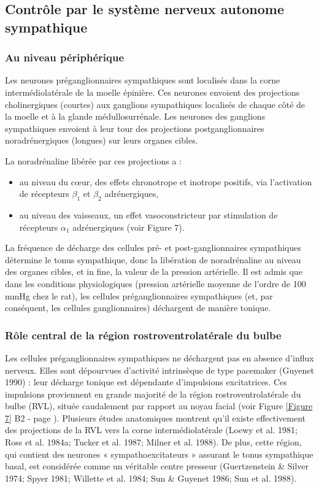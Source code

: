 \documentclass[a4paper,12pt,twoside]{report}
\begin{document}
\subsection{Contrôle par le système nerveux autonome sympathique}

\subsubsection{Au niveau périphérique}

Les neurones préganglionnaires sympathiques sont localisés dans la corne intermédiolatérale de la moelle épinière. Ces neurones envoient des projections cholinergiques (courtes) aux ganglions sympathiques localisés de chaque côté de la moelle et à la glande médullosurrénale. Les neurones des ganglions sympathiques envoient à leur tour des projections postganglionnaires noradrénergiques (longues) sur leurs organes cibles.

La noradrénaline libérée par ces projections a :

\begin{itemize}
\item au niveau du cœur, des effets chronotrope et inotrope positifs, via l’activation de récepteurs $\beta_{1}$ et $\beta_{2}$ adrénergiques, 
\item au niveau des vaisseaux, un effet vasoconstricteur par stimulation de récepteurs $\alpha_{1}$ adrénergiques (voir Figure 7).
\end{itemize}

La fréquence de décharge des cellules pré- et post-ganglionnaires sympathiques détermine le tonus sympathique, donc la libération de noradrénaline au niveau des organes cibles, et in fine, la valeur de la pression artérielle. Il est admis que dans les conditions physiologiques (pression artérielle moyenne de l’ordre de 100 mmHg chez le rat), les cellules préganglionnaires sympathiques (et, par conséquent, les cellules ganglionnaires) déchargent de manière tonique.

\subsubsection{Rôle central de la région rostroventrolatérale du bulbe}

Les cellules préganglionnaires sympathiques ne déchargent pas en absence d’influx nerveux. Elles sont dépourvues d’activité intrinsèque de type pacemaker (Guyenet 1990) : leur décharge tonique est dépendante d’impulsions excitatrices. Ces impulsions proviennent en grande majorité de la région rostroventrolatérale du bulbe (RVL), située caudalement par rapport au noyau facial (voir Figure \ref{Figure 7} B2 - page \pageref{Figure 7}). Plusieurs études anatomiques montrent qu’il existe effectivement des projections de la RVL vers la corne intermédiolatérale (Loewy et al. 1981; Ross et al. 1984a; Tucker et al. 1987; Milner et al. 1988). De plus, cette région, qui contient des neurones « sympathoexcitateurs » assurant le tonus sympathique basal, est considérée comme un véritable centre presseur (Guertzenstein \& Silver 1974; Spyer 1981; Willette et al. 1984; Sun \& Guyenet 1986; Sun et al. 1988).
\end{document}
